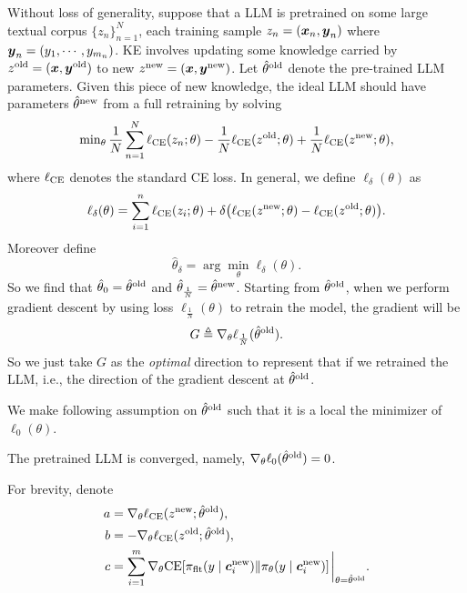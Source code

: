     
Without loss of generality, suppose that a LLM is pretrained on some large textual corpus $\{z_n \}_{n=1}^N$, each training sample $z_n = (\boldsymbol{x}_n, \boldsymbol{y}_n)$ where $\boldsymbol{y}_n = (y_1, \cdots, y_{m_n})$. 
KE involves updating some knowledge carried by $z^{\text{old}} = (\boldsymbol{x}, \boldsymbol{y}^{\text{old}})$ to new $z^{\text{new}} = (\boldsymbol{x}, \boldsymbol{y}^{\text{new}})$.
Let $\hat{\theta}^{\text{old}}$ denote the pre-trained LLM parameters.
Given this piece of new knowledge, 
the ideal LLM should have parameters $\hat{\theta}^{\text{new}}$ from a full retraining by solving  
\begin{align}
\label{eq:opt-param}
\min\nolimits_\theta \frac{1}{N} \sum_{n=1}^N \ell_{\text{CE}} (z_n; \theta) - \frac{1}{N} \ell_{\text{CE}} (z^{\text{old}}; \theta) + \frac{1}{N}\ell_{\text{CE}} (z^{\text{new}}; \theta),
\end{align}
where $\ell_{\text{CE}}$ denotes the standard CE loss.
In general, we define $\ell_\delta(\theta)$ as
\begin{equation*}
    \ell_\delta(\theta) = \sum_{i=1}^n \ell_{\text{CE}} (z_i; \theta) + \delta \qty(\ell_{\text{CE}} (z^{\text{new}}; \theta) - \ell_{\text{CE}} (z^{\text{old}}; \theta)).
\end{equation*}
Moreover define
\begin{equation*}
    \hat{\theta}_{\delta} = \arg\min_{\theta} \ell_\delta(\theta).
\end{equation*}
So we find that $\hat \theta_0 = \hat \theta^{\text{old}}$ and $\hat \theta_{\frac{1}{N}} = \hat \theta^{\text{new}}$.
Starting from $\hat{\theta}^{\text{old}}$, when we perform gradient descent by using loss $\ell_{\frac{1}{N}}(\theta)$ to retrain the model, the gradient will be
\begin{equation}
\label{eq: G definition}
    G \triangleq \nabla_\theta \ell_{\frac{1}{N}}(\hat{\theta}^{\text{old}}).
\end{equation}
So we just take $G$ as the \textit{optimal} direction to represent that if we retrained the LLM, i.e., the direction of the gradient descent at $\hat \theta^{\text{old}}$.

We make following assumption on $\hat \theta^{\text{old}}$ such that it is a local the minimizer of $\ell_0(\theta)$.
\begin{assumption}
\label{asmp:stationary}
    The pretrained LLM is converged, namely, $\nabla_\theta \ell_0 (\hat \theta^{\text{old}}) = 0$. 
\end{assumption}
For brevity, denote
\begin{equation}
\begin{aligned}
\label{eq: abc definition}
a 
&=  
\nabla_\theta \ell_\ce (z^\new; \hat{\theta}^\old), \\
b
&= 
- \nabla_\theta \ell_{\ce} (z^\old; \hat{\theta}^\old), \\
c 
&=
\sum_{i =1}^m \nabla_\theta \ce \qty[ \pif(y \mid \cv_i^\new) \|  \pi_\theta(y \mid \cv_i^\new)]\eval_{\theta = \hat{\theta}^\old}.
\end{aligned}
\end{equation}

